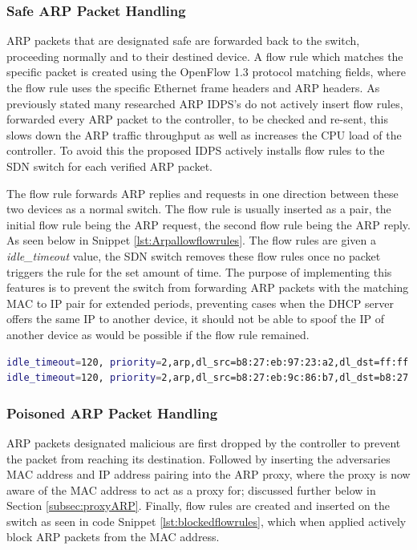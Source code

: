 \documentclass[12pt, oneside]{book}
\begin{document}
\subsubsection{Safe ARP Packet Handling}
ARP packets that are designated safe are forwarded back to the switch, proceeding normally and to their
destined device. A flow rule which matches the specific packet is created using the OpenFlow 1.3 protocol
matching fields, where the flow rule uses the specific Ethernet frame headers and ARP headers. As previously stated many researched 
ARP IDPS's do not actively insert flow rules, forwarded every ARP packet to the controller, to be checked and re-sent,
this slows down the ARP traffic throughput as well as increases the CPU load of the controller. To avoid this the proposed IDPS
actively installs flow rules to the SDN switch for each verified ARP packet.

The flow rule forwards ARP 
replies and requests in one direction between these two devices as a normal switch.
The flow rule is usually inserted as a pair, the initial flow rule being the ARP request, the second flow rule being
the ARP reply. As seen below in Snippet \ref{lst:Arpallowflowrules}.
The flow rules are given a \emph{idle\_timeout} value, the SDN switch removes these flow rules once no packet 
triggers the rule for the set amount of time. The purpose of implementing this features is to prevent the switch from forwarding 
ARP packets with the matching MAC to IP pair for extended periods, preventing cases when the DHCP server offers the same IP to another 
device, it should not be able to spoof the IP of another device as would be possible if the flow rule remained.

\begin{lstlisting}[language=Bash,caption={ARP packets Flow Rules},captionpos=b,label={lst:Arpallowflowrules}]
idle_timeout=120, priority=2,arp,dl_src=b8:27:eb:97:23:a2,dl_dst=ff:ff:ff:ff:ff:ff,arp_spa=192.168.4.178,arp_sha=b8:27:eb:97:23:a2 actions=NORMAL
idle_timeout=120, priority=2,arp,dl_src=b8:27:eb:9c:86:b7,dl_dst=b8:27:eb:97:23:a2,arp_spa=192.168.4.106,arp_sha=b8:27:eb:9c:86:b7 actions=NORMAL
\end{lstlisting}

\subsubsection{Poisoned ARP Packet Handling}
\label{subsubsec:posarp}
ARP packets designated malicious are first dropped by the controller to prevent the packet from reaching its destination.
Followed by inserting the adversaries MAC address and IP address pairing into the ARP proxy, where the proxy
is now aware of the MAC address to act as a proxy for; discussed further below in Section \ref{subsec:proxyARP}.
Finally, flow rules are created and inserted on the switch as seen in code Snippet \ref{lst:blockedflowrules},
which when applied actively block ARP packets from the MAC address.
\end{document}
